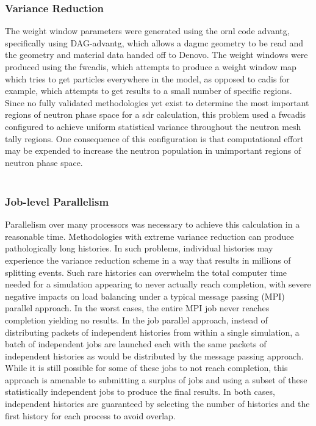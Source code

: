 \documentclass[12pt]{article}
\begin{document}
\subsubsection{Variance Reduction}
The weight window parameters were generated using the \gls{ornl} code
\gls{advantg}, specifically using DAG-\gls{advantg}, which allows a
\gls{dagmc} geometry to be read and the geometry and material data handed off to
Denovo. The weight windows were produced using the \gls{fwcadis},
which attempts to produce a weight window map which tries to get particles
everywhere in the model, as opposed to \gls{cadis} for example, which
attempts to get results to a small number of specific regions.  Since no 
fully validated methodologies yet exist to determine the most important regions of
neutron phase space for a \gls{sdr} calculation, this problem used a \gls{fwcadis}
configured to achieve uniform statistical variance throughout the neutron mesh
tally regions.  One consequence of this configuration is that computational
effort may be expended to increase the neutron population in unimportant regions 
of neutron phase space.
\\
\\

\subsubsection{Job-level Parallelism}
Parallelism over many processors was necessary to achieve this calculation in
a reasonable time. Methodologies with extreme variance reduction can produce
pathologically long histories.  In such problems, individual histories may
experience the variance reduction scheme in a way that results in millions of
splitting events.  Such rare histories can overwhelm the total computer time
needed for a simulation appearing to never actually reach completion, with
severe negative impacts on load balancing under a typical message passing
(MPI) parallel approach.  In the worst cases, the entire MPI job never reaches
completion yielding no results.  In the job parallel approach, instead of
distributing packets of independent histories from within a single simulation,
a batch of independent jobs are launched each with the same packets of
independent histories as would be distributed by the message passing approach.  
While it is still possible for some of these jobs to
not reach completion, this approach is amenable to submitting a surplus of
jobs and using a subset of these statistically independent jobs to produce the
final results.  In both cases, independent histories are guaranteed by
selecting the number of histories and the first history for each process to
avoid overlap.  
\end{document}
